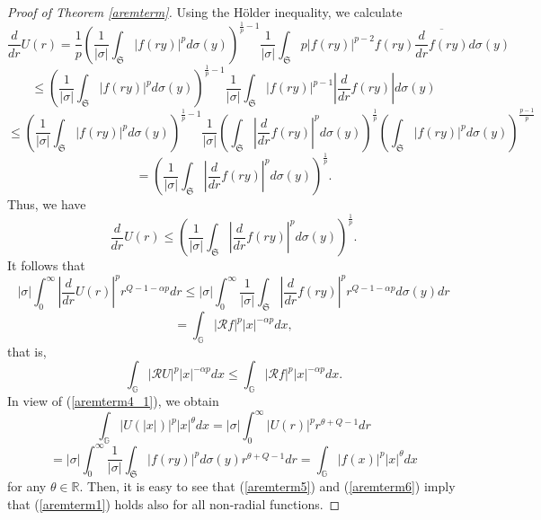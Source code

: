 \documentclass[a4paper,12pt,reqno]{amsart}
\renewcommand\eqref[1]{(\ref{#1})} %
\numberwithin{equation}{section}
\theoremstyle{plain}
\theoremstyle{definition}
\renewcommand{\wp}{\mathfrak S}
\begin{document}
\begin{proof}[Proof of Theorem \ref{aremterm}]
Using the H\"{o}lder inequality, we calculate
$$\frac{d}{dr}U(r)=\frac{1}{p}\left(\frac{1}{|\sigma|}\int_{\wp}|f(ry)|^{p}d\sigma(y)\right)^{\frac{1}{p}-1}
\frac{1}{|\sigma|}\int_{\wp}p|f(ry)|^{p-2}f(ry)\overline{\frac{d}{dr}f(ry)}d\sigma(y)$$
$$\leq\left(\frac{1}{|\sigma|}\int_{\wp}|f(ry)|^{p}d\sigma(y)\right)^{\frac{1}{p}-1}
\frac{1}{|\sigma|}\int_{\wp}|f(ry)|^{p-1}\left|\frac{d}{dr}f(ry)\right|d\sigma(y)$$
$$\leq \left(\frac{1}{|\sigma|}\int_{\wp}|f(ry)|^{p}d\sigma(y)\right)^{\frac{1}{p}-1}
\frac{1}{|\sigma|}\left(\int_{\wp}\left|\frac{d}{dr}f(ry)\right|^{p}d\sigma(y)\right)^{\frac{1}{p}}
\left(\int_{\wp}|f(ry)|^{p}d\sigma(y)\right)^{\frac{p-1}{p}}$$
$$=\left(\frac{1}{|\sigma|}\int_{\wp}\left|\frac{d}{dr}f(ry)\right|^{p}d\sigma(y)\right)^{\frac{1}{p}}.$$
Thus, we have
$$
\frac{d}{dr}U(r)\leq\left(\frac{1}{|\sigma|}\int_{\wp}\left|\frac{d}{dr}f(ry)\right|^{p}d\sigma(y)\right)^{\frac{1}{p}}.
$$
It follows that
$$|\sigma|\int_{0}^{\infty}\left|\frac{d}{dr}U(r)\right|^{p}r^{Q-1-\alpha p}dr\leq
|\sigma|\int_{0}^{\infty}\frac{1}{|\sigma|}\int_{\wp}\left|\frac{d}{dr}f(ry)\right|^{p}r^{Q-1-\alpha p}d\sigma(y)dr$$
$$=\int_{\mathbb{G}}\left|\mathcal{R}f\right|^{p}|x|^{-\alpha p}dx,$$
that is,
\begin{equation}\label{aremterm5}
\int_{\mathbb{G}}\left|\mathcal{R}U\right|^{p}|x|^{-\alpha p}dx\leq\int_{\mathbb{G}}\left|\mathcal{R}f\right|^{p}|x|^{-\alpha p}dx.
\end{equation}
In view of \eqref{aremterm4_1}, we obtain
$$\int_{\mathbb{G}}|U(|x|)|^{p}|x|^{\theta}dx=|\sigma|\int_{0}^{\infty}|U(r)|^{p}r^{\theta+Q-1}dr$$
\begin{equation}\label{aremterm6}=|\sigma|\int_{0}^{\infty}\frac{1}{|\sigma|}\int_{\wp}|f(ry)|^{p}d\sigma(y)r^{\theta+Q-1}dr=
\int_{\mathbb{G}}|f(x)|^{p}|x|^{\theta}dx \end{equation}
for any $\theta\in\mathbb{R}$.
Then, it is easy to see that \eqref{aremterm5} and \eqref{aremterm6} imply that \eqref{aremterm1} holds also for all non-radial functions.
\end{proof}
\end{document}
